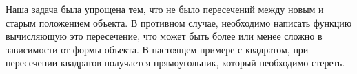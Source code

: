 Наша задача была упрощена тем, что не было пересечений между новым и старым 
положением объекта. В противном случае, необходимо написать функцию вычисляющую 
это пересечение, что может быть более или менее сложно в зависимости от формы 
объекта. В настоящем примере с квадратом, при пересечении квадратов получается 
прямоугольник, который необходимо стереть.
